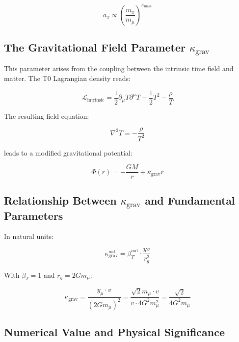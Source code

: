 \documentclass[12pt,a4paper]{article}
\begin{document}
	\begin{equation}
		a_x \propto \left(\frac{m_x}{m_\mu}\right)^{\kappa_{\text{mass}}}
	\end{equation}
	
	\subsection{The Gravitational Field Parameter $\kappa_{\text{grav}}$}
	
	This parameter arises from the coupling between the intrinsic time field and matter. The T0 Lagrangian density reads:
	
	\begin{equation}
		\mathcal{L}_{\text{intrinsic}} = \frac{1}{2}\partial_\mu T \partial^\mu T - \frac{1}{2}T^2 - \frac{\rho}{T}
	\end{equation}
	
	The resulting field equation:
	
	\begin{equation}
		\nabla^2 T = -\frac{\rho}{T^2}
	\end{equation}
	
	leads to a modified gravitational potential:
	
	\begin{equation}
		\Phi(r) = -\frac{GM}{r} + \kappa_{\text{grav}} r
	\end{equation}
	
	\subsection{Relationship Between $\kappa_{\text{grav}}$ and Fundamental Parameters}
	
	In natural units:
	
	\begin{equation}
		\kappa_{\text{grav}}^{\text{nat}} = \beta_T^{\text{nat}} \cdot \frac{yv}{r_g^2}
	\end{equation}
	
	With $\beta_T = 1$ and $r_g = 2Gm_\mu$:
	
	\begin{equation}
		\kappa_{\text{grav}} = \frac{y_\mu \cdot v}{(2Gm_\mu)^2} = \frac{\sqrt{2} m_\mu \cdot v}{v \cdot 4G^2m_\mu^2} = \frac{\sqrt{2}}{4G^2m_\mu}
	\end{equation}
	
	\subsection{Numerical Value and Physical Significance}
	
\end{document}
